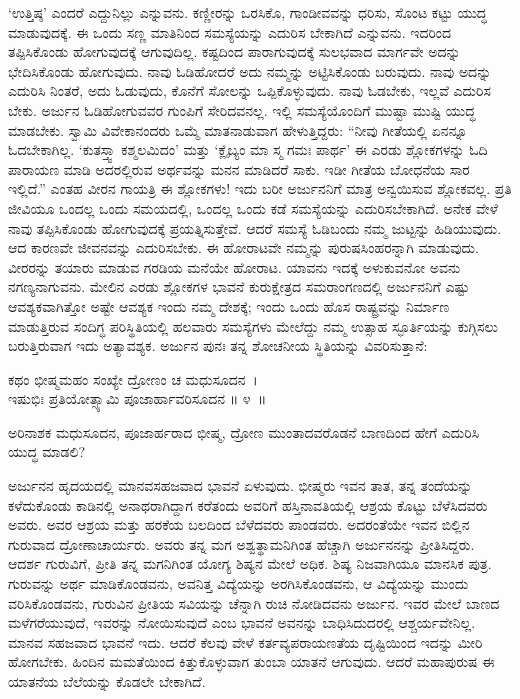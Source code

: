 ‘ಉತ್ತಿಷ್ಠ’ ಎಂದರೆ ಎದ್ದುನಿಲ್ಲು ಎನ್ನುವನು. ಕಣ್ಣೀರನ್ನು ಒರಸಿಕೊ, ಗಾಂಡೀವವನ್ನು ಧರಿಸು, ಸೊಂಟ ಕಟ್ಟು ಯುದ್ಧ ಮಾಡುವುದಕ್ಕೆ. ಈ ಒಂದು ಸಣ್ಣ ಮಾತಿನಿಂದ ಸಮಸ್ಯೆಯನ್ನು ಎದುರಿಸ ಬೇಕಾಗಿದೆ ಎನ್ನುವನು. ಇದರಿಂದ ತಪ್ಪಿಸಿಕೊಂಡು ಹೋಗುವುದಕ್ಕೆ ಆಗುವುದಿಲ್ಲ. ಕಷ್ಟದಿಂದ ಪಾರಾಗುವುದಕ್ಕೆ ಸುಲಭವಾದ ಮಾರ್ಗವೇ ಅದನ್ನು ಭೇದಿಸಿಕೊಂಡು ಹೋಗುವುದು. ನಾವು ಓಡಿಹೋದರೆ ಅದು ನಮ್ಮನ್ನು ಅಟ್ಟಿಸಿಕೊಂಡು ಬರುವುದು. ನಾವು ಅದನ್ನು ಎದುರಿಸಿ ನಿಂತರೆ, ಅದು ಓಡುವುದು, ಕೊನೆಗೆ ಸೋಲನ್ನು ಒಪ್ಪಿಕೊಳ್ಳುವುದು. ನಾವು ಓಡಬೇಕು, ಇಲ್ಲವೆ ಎದುರಿಸ ಬೇಕು. ಅರ್ಜುನ ಓಡಿಹೋಗುವವರ ಗುಂಪಿಗೆ ಸೇರಿದವನಲ್ಲ. ಇಲ್ಲಿ ಸಮಸ್ಯೆಯೊಂದಿಗೆ ಮುಷ್ಟಾ ಮುಷ್ಟಿ ಯುದ್ಧ ಮಾಡಬೇಕು. ಸ್ವಾಮಿ ವಿವೇಕಾನಂದರು ಒಮ್ಮೆ ಮಾತನಾಡುವಾಗ ಹೇಳುತ್ತಿದ್ದರು: “ನೀವು ಗೀತೆಯಲ್ಲಿ ಏನನ್ನೂ ಓದಬೇಕಾಗಿಲ್ಲ. ‘ಕುತಸ್ತ್ವಾ ಕಶ್ಮಲಮಿದಂ’ ಮತ್ತು ‘ಕ್ಲೈಬ್ಯಂ ಮಾ ಸ್ಮ ಗಮಃ ಪಾರ್ಥ’ ಈ ಎರಡು ಶ್ಲೋಕಗಳನ್ನು ಓದಿ ಪಾರಾಯಣ ಮಾಡಿ ಅದರಲ್ಲಿರುವ ಅರ್ಥವನ್ನು ಮನನ ಮಾಡಿದರೆ ಸಾಕು. ಇಡೀ ಗೀತೆಯ ಬೋಧನೆಯ ಸಾರ ಇಲ್ಲಿದೆ.” ಎಂತಹ ವೀರನ ಗಾಯತ್ರಿ ಈ ಶ್ಲೋಕಗಳು! ಇದು ಬರೀ ಅರ್ಜುನನಿಗೆ ಮಾತ್ರ ಅನ್ವಯಿಸುವ ಶ್ಲೋಕವಲ್ಲ. ಪ್ರತಿ ಜೀವಿಯೂ ಒಂದಲ್ಲ ಒಂದು ಸಮಯದಲ್ಲಿ, ಒಂದಲ್ಲ ಒಂದು ಕಡೆ ಸಮಸ್ಯೆಯನ್ನು ಎದುರಿಸಬೇಕಾಗಿದೆ. ಅನೇಕ ವೇಳೆ ನಾವು ತಪ್ಪಿಸಿಕೊಂಡು ಹೋಗುವುದಕ್ಕೆ ಪ್ರಯತ್ನಿಸುತ್ತೇವೆ. ಆದರೆ ಸಮಸ್ಯೆ ಓಡಿಬಂದು ನಮ್ಮ ಜುಟ್ಟನ್ನು ಹಿಡಿಯುವುದು. ಆದ ಕಾರಣವೇ ಜೀವನವನ್ನು ಎದುರಿಸಬೇಕು. ಈ ಹೋರಾಟವೇ ನಮ್ಮನ್ನು ಪುರುಷಸಿಂಹರನ್ನಾಗಿ ಮಾಡುವುದು. ವೀರರನ್ನು ತಯಾರು ಮಾಡುವ ಗರಡಿಯ ಮನೆಯೇ ಹೋರಾಟ. ಯಾವನು ಇದಕ್ಕೆ ಅಳುಕುವನೋ ಅವನು ನಗಣ್ಯನಾಗುವನು. ಮೇಲಿನ ಎರಡು ಶ್ಲೋಕಗಳ ಭಾವನೆ ಕುರುಕ್ಷೇತ್ರದ ಸಮರಾಂಗಣದಲ್ಲಿ ಅರ್ಜುನನಿಗೆ ಎಷ್ಟು ಆವಶ್ಯಕವಾಗಿತ್ತೋ ಅಷ್ಟೇ ಆವಶ್ಯಕ ಇಂದು ನಮ್ಮ ದೇಶಕ್ಕೆ; ಇಂದು ಒಂದು ಹೊಸ ರಾಷ್ಟ್ರವನ್ನು ನಿರ್ಮಾಣ ಮಾಡುತ್ತಿರುವ ಸಂದಿಗ್ಧ ಪರಿಸ್ಥಿತಿಯಲ್ಲಿ ಹಲವಾರು ಸಮಸ್ಯೆಗಳು ಮೇಲೆದ್ದು ನಮ್ಮ ಉತ್ಸಾಹ ಸ್ಫೂರ್ತಿಯನ್ನು ಕುಗ್ಗಿಸಲು ಬರುತ್ತಿರುವಾಗ ಇದು ಅತ್ಯಾವಶ್ಯಕ. ಅರ್ಜುನ ಪುನಃ ತನ್ನ ಶೋಚನೀಯ ಸ್ಥಿತಿಯನ್ನು ವಿವರಿಸುತ್ತಾನೆ:

\begin{shloka}
ಕಥಂ ಭೀಷ್ಮಮಹಂ ಸಂಖ್ಯೇ ದ್ರೋಣಂ ಚ ಮಧುಸೂದನ~।\\ಇಷುಭಿಃ ಪ್ರತಿಯೋತ್ಸ್ಯಾಮಿ ಪೂಜಾರ್ಹಾವರಿಸೂದನ \hfill॥ ೪~॥
\end{shloka}

\begin{artha}
ಅರಿನಾಶಕ ಮಧುಸೂದನ, ಪೂಜಾರ್ಹರಾದ ಭೀಷ್ಮ, ದ್ರೋಣ ಮುಂತಾದವರೊಡನೆ ಬಾಣದಿಂದ ಹೇಗೆ ಎದುರಿಸಿ ಯುದ್ಧ ಮಾಡಲಿ?
\end{artha}

ಅರ್ಜುನನ ಹೃದಯದಲ್ಲಿ ಮಾನವಸಹಜವಾದ ಭಾವನೆ ಏಳುವುದು. ಭೀಷ್ಮರು ಇವನ ತಾತ, ತನ್ನ ತಂದೆಯನ್ನು ಕಳೆದುಕೊಂಡು ಕಾಡಿನಲ್ಲಿ ಅನಾಥರಾಗಿದ್ದಾಗ ಕರೆತಂದು ಅವರಿಗೆ ಹಸ್ತಿನಾವತಿಯಲ್ಲಿ ಆಶ್ರಯ ಕೊಟ್ಟು ಬೆಳೆಸಿದವರು ಅವರು. ಅವರ ಆಶ್ರಯ ಮತ್ತು ಹರಕೆಯ ಬಲದಿಂದ ಬೆಳೆದವರು ಪಾಂಡವರು. ಅದರಂತೆಯೇ ಇವನ ಬಿಲ್ಲಿನ ಗುರುವಾದ ದ್ರೋಣಾ\-ಚಾರ್ಯರು. ಅವರು ತನ್ನ ಮಗ ಅಶ್ವತ್ಥಾಮನಿಗಿಂತ ಹೆಚ್ಚಾಗಿ ಅರ್ಜುನನನ್ನು ಪ್ರೀತಿಸಿದ್ದರು. ಆದರ್ಶ ಗುರುವಿಗೆ, ಪ್ರೀತಿ ತನ್ನ ಮಗನಿಗಿಂತ ಯೋಗ್ಯ ಶಿಷ್ಯನ ಮೇಲೆ ಅಧಿಕ. ಶಿಷ್ಯ ನಿಜ\-ವಾಗಿಯೂ ಮಾನಸಿಕ ಪುತ್ರ. ಗುರುವನ್ನು ಅರ್ಥ ಮಾಡಿಕೊಂಡವನು, ಅವನಿತ್ತ ವಿದ್ಯೆಯನ್ನು ಅರಗಿಸಿಕೊಂಡವನು, ಆ ವಿದ್ಯೆಯನ್ನು ಮುಂದು ವರಿಸಿಕೊಂಡವನು, ಗುರುವಿನ ಪ್ರೀತಿಯ ಸವಿಯನ್ನು ಚೆನ್ನಾಗಿ ರುಚಿ ನೋಡಿದವನು ಅರ್ಜುನ. ಇವರ ಮೇಲೆ ಬಾಣದ ಮಳೆಗರೆಯುವುದೆ, ಇವರನ್ನು ನೋಯಿಸುವುದೆ ಎಂಬ ಭಾವನೆ ಅವನನ್ನು ಬಾಧಿಸಿದುದರಲ್ಲಿ ಆಶ್ಚರ್ಯವೇನಿಲ್ಲ. ಮಾನವ ಸಹಜವಾದ ಭಾವನೆ ಇದು. ಆದರೆ ಕೆಲವು ವೇಳೆ ಕರ್ತವ್ಯಪರಾಯಣತೆಯ ದೃಷ್ಟಿಯಿಂದ ಇದನ್ನು ಮೀರಿ ಹೋಗಬೇಕು. ಹಿಂದಿನ ಮಮತೆಯಿಂದ ಕಿತ್ತುಕೊಳ್ಳುವಾಗ ತುಂಬಾ ಯಾತನೆ ಆಗುವುದು. ಆದರೆ ಮಹಾಪುರುಷ ಈ ಯಾತನೆಯ ಬೆಲೆಯನ್ನು ಕೊಡಲೇ ಬೇಕಾಗಿದೆ.

